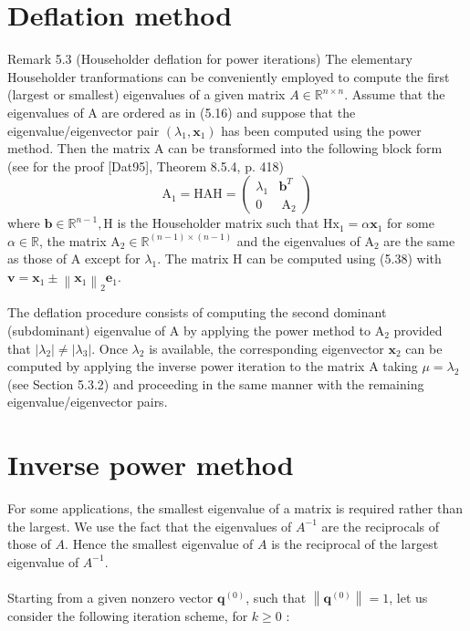 \documentclass[11pt]{book}
\begin{document}
\section*{Deflation method}

Remark 5.3 (Householder deflation for power iterations) The elementary Householder tranformations can be conveniently employed to compute the first (largest or smallest) eigenvalues of a given matrix $A \in \mathbb{R}^{n \times n}$. Assume that the eigenvalues of A are ordered as in (5.16) and suppose that the eigenvalue/eigenvector pair $\left(\lambda_1, \mathbf{x}_1\right)$ has been computed using the power method. Then the matrix A can be transformed into the following block form (see for the proof [Dat95], Theorem 8.5.4, p. 418)
$$
\mathrm{A}_1=\mathrm{HAH}=\left(\begin{array}{ll}
\lambda_1 & \mathbf{b}^T \\
0 & \mathrm{~A}_2
\end{array}\right)
$$
where $\mathbf{b} \in \mathbb{R}^{n-1}, \mathrm{H}$ is the Householder matrix such that $\mathrm{Hx}_1=\alpha \mathbf{x}_1$ for some $\alpha \in \mathbb{R}$, the matrix $\mathrm{A}_2 \in \mathbb{R}^{(n-1) \times(n-1)}$ and the eigenvalues of $\mathrm{A}_2$ are the same as those of $\mathrm{A}$ except for $\lambda_1$. The matrix $\mathrm{H}$ can be computed using (5.38) with $\mathbf{v}=\mathbf{x}_1 \pm\left\|\mathbf{x}_1\right\|_2 \mathbf{e}_1$.

The deflation procedure consists of computing the second dominant (subdominant) eigenvalue of $\mathrm{A}$ by applying the power method to $\mathrm{A}_2$ provided that $\left|\lambda_2\right| \neq\left|\lambda_3\right|$. Once $\lambda_2$ is available, the corresponding eigenvector $\mathbf{x}_2$ can be computed by applying the inverse power iteration to the matrix $\mathrm{A}$ taking $\mu=\lambda_2$ (see Section 5.3.2) and proceeding in the same manner with the remaining eigenvalue/eigenvector pairs. 

\section*{Inverse power method}
For some applications, the smallest eigenvalue of a matrix is required rather than the largest. We use the fact that the eigenvalues of $A^{-1}$ are the reciprocals of those of $A$.
Hence the smallest eigenvalue of $A$ is the reciprocal of the largest eigenvalue of $A^{-1}$.\\ \\
Starting from a given nonzero vector $\mathbf{q}^{(0)}$, such that $\left\|\mathbf{q}^{(0)}\right\|=1$, let us consider the following iteration scheme, for $k \geq 0$ :
\end{document}
